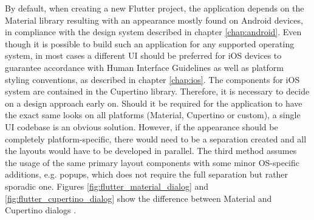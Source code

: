 By default, when creating a new Flutter project, the application depends on the Material library resulting with an appearance mostly found on Android devices, in compliance with the design system described in chapter \ref{chap:android}. Even though it is possible to build such an application for any supported operating system, in most cases a different UI should be preferred for iOS devices to guarantee accordance with Human Interface Guidelines as well as platform styling conventions, as described in chapter \ref{chap:ios}. The components for iOS system are contained in the Cupertino library. Therefore, it is necessary to decide on a design approach early on. Should it be required for the application to have the exact same looks on all platforms (Material, Cupertino or custom), a single UI codebase is an obvious solution. However, if the appearance should be completely platform-specific, there would need to be a separation created and all the layouts would have to be developed in parallel. The third method assumes the usage of the same primary layout components with some minor OS-specific additions, e.g. popups, which does not require the full separation but rather sporadic one. Figures \ref{fig:flutter_material_dialog} and \ref{fig:flutter_cupertino_dialog} show the difference between Material and Cupertino dialogs \cite{flutter_docs_architecture,kosinski_flutter_vs_rn_vs_qt}.


